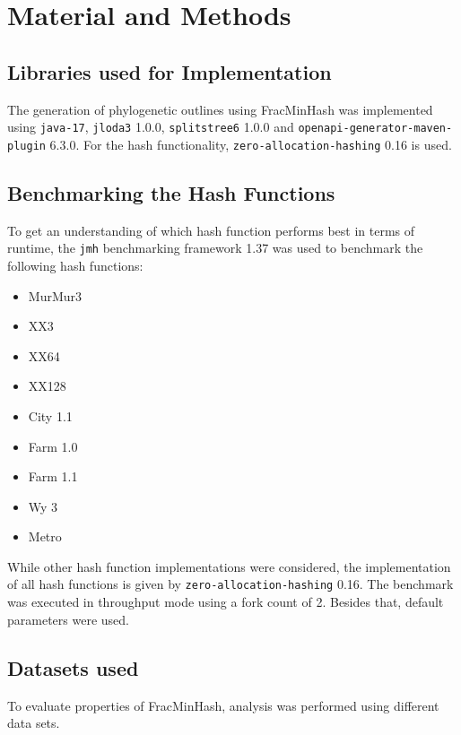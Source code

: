 
\chapter{Material and Methods}
  \label{sec:matmet}

\section{Libraries used for Implementation}
The generation of phylogenetic outlines using FracMinHash was implemented using
\texttt{java-17}, \texttt{jloda3} 1.0.0, \texttt{splitstree6} 1.0.0
\cite{husonApplicationPhylogeneticNetworks2006} and
\texttt{openapi-generator-maven-plugin} 6.3.0. For the hash functionality,
\texttt{zero-allocation-hashing} 0.16 is used. 


\section{Benchmarking the Hash Functions}
To get an understanding of which hash function performs best in terms of
runtime, the \texttt{jmh} benchmarking framework 1.37 was used to benchmark the
following hash functions:

\begin{itemize}
  \item MurMur3 
  \item XX3
  \item XX64
  \item XX128
  \item City 1.1
  \item Farm 1.0
  \item Farm 1.1
  \item Wy 3
  \item Metro
\end{itemize}
 
While other hash function implementations were considered, the implementation of
all hash functions is given by \texttt{zero-allocation-hashing} 0.16. The
benchmark was executed in throughput mode using a fork count of 2. Besides that,
default parameters were used.


\section{Datasets used}
To evaluate properties of FracMinHash, analysis was performed using different
data sets. 

